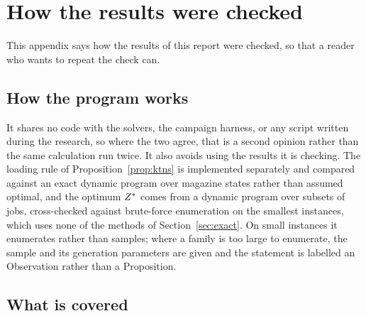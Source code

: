 \section{How the results were checked}\label{app:verify}

This appendix says how the results of this report were checked, so that a reader who
wants to repeat the check can.

\subsection{How the program works}\label{ssec:verify-principle}

It shares no code with the solvers, the campaign harness, or any script written during
the research, so where the two agree, that is a second opinion rather than the same
calculation run twice. It also avoids using the results it is checking. The loading rule
of Proposition~\ref{prop:ktns} is implemented separately and compared against an exact
dynamic program over magazine states rather than assumed optimal, and the optimum $Z^{\ast}$
comes from a dynamic program over subsets of jobs, cross-checked against brute-force
enumeration on the smallest instances, which uses none of the methods of
Section~\ref{sec:exact}. On small instances it enumerates rather than samples; where a
family is too large to enumerate, the sample and its generation parameters are given and
the statement is labelled an Observation rather than a Proposition.

\subsection{What is covered}\label{ssec:verify-covered}

